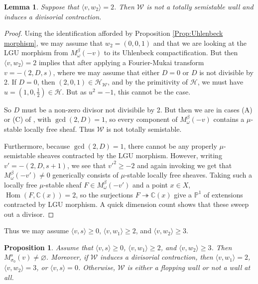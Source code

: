 \documentclass[leqno,11pt]{amsart}
\def\C{\ensuremath{\mathbb{C}}}
\def\P{\ensuremath{\mathbb{P}}}
\def\Hom{\mathop{\mathrm{Hom}}\nolimits}
\def\onto{\ensuremath{\twoheadrightarrow}}
\newtheorem{Prop}[Thm]{Proposition}
\newtheorem{Lem}[Thm]{Lemma}
\theoremstyle{definition}
\def\C{\ensuremath{\mathbb{C}}}
\def\P{\ensuremath{\mathbb{P}}}
\def\HH{\ensuremath{\mathcal H}}
\def\WW{\ensuremath{\mathcal W}}
\begin{document}
\begin{Lem}
Suppose that $\langle v,w_2\rangle=2$.  Then $\WW$ is not a totally semistable wall and induces a divisorial contraction.
\end{Lem}
\begin{proof}
Using the identification afforded by Proposition \ref{Prop:Uhlenbeck morphism}, we may assume that $w_2=(0,0,1)$ and that we are looking at the LGU morphism from $M_{\omega}^{\beta}(-v)$ to its Uhlenbeck compactification.  But then $\langle v,w_2\rangle=2$ implies that after applying a Fourier-Mukai transform $v=-(2,D,s)$, where we may assume that either $D=0$ or $D$ is not divisible by 2.  If $D=0$, then $(2,0,1)\in\HH_{\WW}$, and by the primitivity of $\HH$, we must have $u=(1,0,\frac{1}{2})\in\HH$.  But as $u^2=-1$, this cannot be the case.

So $D$ must be a non-zero divisor not divisibile by 2.  But then we are in cases (A) or (C) of \cite[Theorem 2.1]{Yos16a}, with $\gcd(2,D)=1$, so every component of $M_{\omega}^{\beta}(-v)$ contains a $\mu$-stable locally free sheaf.  Thus $\WW$ is not totally semistable.

Furthermore, because $\gcd(2,D)=1$, there cannot be any properly $\mu$-semistable sheaves contracted by the LGU morphism.  However, writing $v'=-(2,D,s+1)$, we see that $v'^2\geq -2$ and again invoking \cite[Theorem 2.1]{Yos16a} we get that $M_{\omega}^{\beta}(-v')\neq 0$ generically consists of $\mu$-stable locally free sheaves.  Taking such a locally free $\mu$-stable sheaf $F\in M_{\omega}^{\beta}(-v')$ and a point $x\in X$, $\Hom(F,\C(x))=2$, so the surjections $F\onto\C(x)$ give a $\P^1$ of extensions contracted by LGU morphism.  A quick dimension count shows that these sweep out a divisor.
\end{proof}
Thus we may assume $\langle v,s\rangle\geq 0$, $\langle v,w_1\rangle\geq 2$, and $\langle v,w_2\rangle\geq 3$.
\begin{Prop}
Assume that $\langle v,s\rangle\geq 0$, $\langle v,w_1\rangle\geq 2$, and $\langle v,w_2\rangle\geq 3$.  Then $M_{\sigma_0}^s(v)\neq\varnothing$.  Moreover, if $\WW$ induces a divisorial contraction, then $\langle v,w_1\rangle=2$, $\langle v,w_2\rangle=3$, or $\langle v,s\rangle=0$.  Otherwise, $\WW$ is either a flopping wall or not a wall at all.
\end{Prop}
\end{document}
